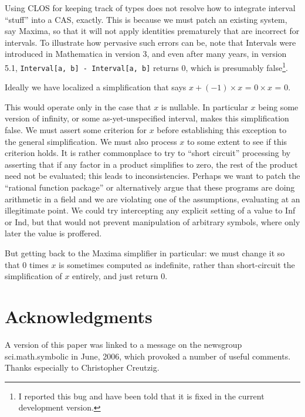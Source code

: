 \documentclass{article}
\begin{document}
{Using CLOS for keeping track of types does not resolve how to
integrate interval ``stuff'' into a CAS, exactly.  This is because we
must patch an existing system, say Maxima, so that it will not apply
identities prematurely that are incorrect for intervals.  To
illustrate how pervasive such errors can be, note that Intervals were
introduced in Mathematica in version 3, and even after many years, in
version 5.1, {\tt Interval[{a, b}] - Interval[{a, b}]} returns 0,
which is presumably false\footnote{I reported this bug and have been
told that it is fixed in the current development version.}.

Ideally we have localized a simplification that says $x + (-1)\times x$ = 
$0\times x$  = 0.

This would operate only in the case that $x$ is nullable.  In
particular $x$ being some version of infinity, or some
as-yet-unspecified interval, makes this simplification false.  We must
assert some criterion for $x$ before establishing this exception to
the general simplification. We must also process $x$ to some extent to
see if this criterion holds.  It is rather commonplace to try to
``short circuit'' processing by asserting that if any factor in a
product simplifies to zero, the rest of the product need not be
evaluated; this leads to inconsistencies.  Perhaps we want to patch
the ``rational function package'' or alternatively argue that these
programs are doing arithmetic in a field and we are violating one of
the assumptions, evaluating at an illegitimate point.  We could try
intercepting any explicit setting of a value to Inf or Ind, but that
would not prevent manipulation of arbitrary symbols, where only later
the value is proffered.

But getting back to the Maxima simplifier in particular: we must
change it so that $0$ times $x$ is sometimes computed as indefinite,
rather than short-circuit the simplification of $x$ entirely, and just
return $0$.


\section{Acknowledgments}
A version of this paper was linked to a message on the newsgroup
sci.math.symbolic in June, 2006, which provoked a number of useful
comments. Thanks especially to Christopher Creutzig.

\begin{thebibliography}{99}


\end{thebibliography}}
\end{document}

